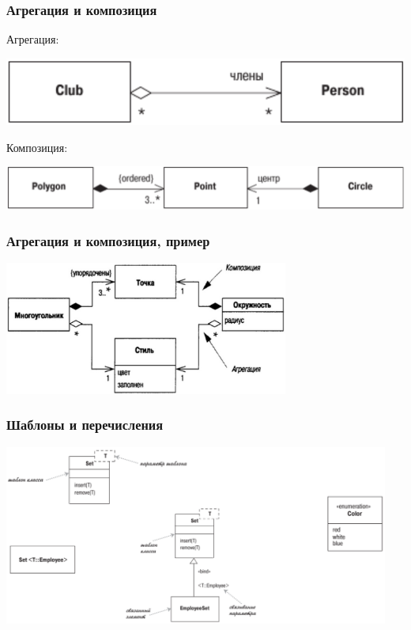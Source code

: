 \documentclass{../mcsslides}
\begin{document}
    \begin{frame}
        \frametitle{Агрегация и композиция}
        Агрегация:
        \begin{center}
            \includegraphics[height=0.1\textheight]{aggregation.png}
        \end{center}
        \vspace{5mm}
        Композиция:
        \begin{center}
            \includegraphics[height=0.1\textheight]{composition.png}
        \end{center}
    \end{frame}

    \begin{frame}
        \frametitle{Агрегация и композиция, пример}
        \begin{center}
            \includegraphics[width=0.7\textwidth]{aggregationAndCompositionExample.png}
        \end{center}
    \end{frame}

    \begin{frame}
        \frametitle{Шаблоны и перечисления}
        \begin{center}
            \includegraphics[width=0.95\textwidth]{genericsAndEnums.png}
        \end{center}
    \end{frame}
\end{document}
